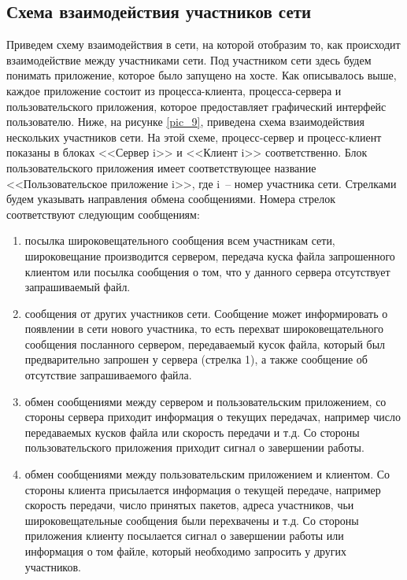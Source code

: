 \subsection{Схема взаимодействия участников сети}
Приведем схему взаимодействия в сети, на которой отобразим то, как
происходит взаимодействие между участниками сети.
\newpar
Под участником сети здесь будем понимать приложение, которое было
запущено на хосте. Как описывалось выше, каждое приложение состоит из
процесса-клиента, процесса-сервера и пользовательского приложения,
которое предоставляет графический интерфейс пользователю.
\newpar
Ниже, на рисунке \ref{pic_9}, приведена схема взаимодействия нескольких участников сети. На
этой схеме, процесс-сервер и процесс-клиент показаны в блоках <<Сервер i>> и
<<Клиент i>> соответственно. Блок пользовательского приложения имеет
соответствующее название <<Пользовательское приложение i>>, где i~-- номер
участника сети. Стрелками будем указывать направления обмена
сообщениями. Номера стрелок соответствуют следующим сообщениям:
\begin{enumerate}
    \item посылка широковещательного сообщения всем участникам сети,
        широковещание производится сервером, передача куска файла запрошенного
        клиентом или посылка сообщения о том, что у данного сервера отсутствует
        запрашиваемый файл.
    \item сообщения от других участников сети. Сообщение может информировать
        о появлении в сети нового участника, то есть перехват широковещательного
        сообщения посланного сервером, передаваемый кусок файла, который был
        предварительно запрошен у сервера (стрелка 1), а также сообщение об
        отсутствие запрашиваемого файла.
    \item обмен сообщениями между сервером и пользовательским приложением,
        со стороны сервера приходит информация о текущих передачах, например
        число передаваемых кусков файла или скорость передачи и т.д. Со стороны
        пользовательского приложения приходит сигнал о завершении работы.
    \item обмен сообщениями между пользовательским приложением и клиентом.
        Со стороны клиента присылается информация о текущей передаче, например
        скорость передачи, число принятых пакетов, адреса участников, чьи
        широковещательные сообщения были перехвачены и т.д. Со стороны
        приложения клиенту посылается сигнал о завершении работы или
        информация о том файле, который необходимо запросить у других
        участников.
\end{enumerate}

